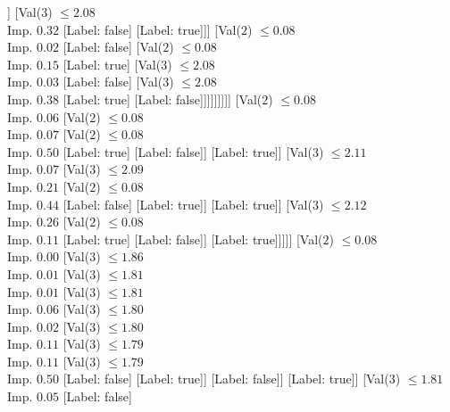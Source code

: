 \documentclass[margin=10pt]{standalone}
\begin{document}
\begin{forest}
											[Val($3$) $ \leq 2.07$ \\ Imp. $0.12$
												[Label: false]
												[Label: true]]
											[Val($3$) $ \leq 2.08$ \\ Imp. $0.32$
												[Label: false]
												[Label: true]]]
										[Val($2$) $ \leq 0.08$ \\ Imp. $0.02$
											[Label: false]
											[Val($2$) $ \leq 0.08$ \\ Imp. $0.15$
												[Label: true]
												[Val($3$) $ \leq 2.08$ \\ Imp. $0.03$
													[Label: false]
													[Val($3$) $ \leq 2.08$ \\ Imp. $0.38$
														[Label: true]
														[Label: false]]]]]]]]]
						[Val($2$) $ \leq 0.08$ \\ Imp. $0.06$
							[Val($2$) $ \leq 0.08$ \\ Imp. $0.07$
								[Val($2$) $ \leq 0.08$ \\ Imp. $0.50$
									[Label: true]
									[Label: false]]
								[Label: true]]
							[Val($3$) $ \leq 2.11$ \\ Imp. $0.07$
								[Val($3$) $ \leq 2.09$ \\ Imp. $0.21$
									[Val($2$) $ \leq 0.08$ \\ Imp. $0.44$
										[Label: false]
										[Label: true]]
									[Label: true]]
								[Val($3$) $ \leq 2.12$ \\ Imp. $0.26$
									[Val($2$) $ \leq 0.08$ \\ Imp. $0.11$
										[Label: true]
										[Label: false]]
									[Label: true]]]]]
					[Val($2$) $ \leq 0.08$ \\ Imp. $0.00$
						[Val($3$) $ \leq 1.86$ \\ Imp. $0.01$
							[Val($3$) $ \leq 1.81$ \\ Imp. $0.01$
								[Val($3$) $ \leq 1.81$ \\ Imp. $0.06$
									[Val($3$) $ \leq 1.80$ \\ Imp. $0.02$
										[Val($3$) $ \leq 1.80$ \\ Imp. $0.11$
											[Val($3$) $ \leq 1.79$ \\ Imp. $0.11$
												[Val($3$) $ \leq 1.79$ \\ Imp. $0.50$
													[Label: false]
													[Label: true]]
												[Label: false]]
											[Label: true]]
										[Val($3$) $ \leq 1.81$ \\ Imp. $0.05$
											[Label: false]

\end{forest}
\end{document}
